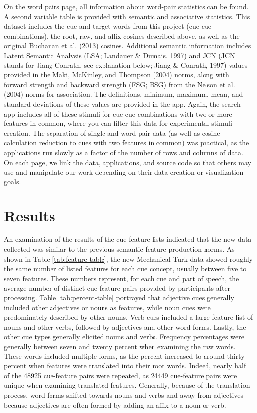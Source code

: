 \documentclass[english,,man]{apa6}
\theoremstyle{definition}
\theoremstyle{definition}
\theoremstyle{definition}
\theoremstyle{remark}
\begin{document}
On the word pairs page, all information about word-pair statistics can
be found. A second variable table is provided with semantic and
associative statistics. This dataset includes the cue and target words
from this project (cue-cue combinations), the root, raw, and affix
cosines described above, as well as the original Buchanan et al. (2013)
cosines. Additional semantic information includes Latent Semantic
Analysis (LSA; Landauer \& Dumais, 1997) and JCN (JCN stands for
Jiang-Conrath, see explanation below; Jiang \& Conrath, 1997) values
provided in the Maki, McKinley, and Thompson (2004) norms, along with
forward strength and backward strength (FSG; BSG) from the Nelson et al.
(2004) norms for association. The definitions, minimum, maximum, mean,
and standard deviations of these values are provided in the app. Again,
the search app includes all of these stimuli for cue-cue combinations
with two or more features in common, where you can filter this data for
experimental stimuli creation. The separation of single and word-pair
data (as well as cosine calculation reduction to cues with two features
in common) was practical, as the applications run slowly as a factor of
the number of rows and columns of data. On each page, we link the data,
applications, and source code so that others may use and manipulate our
work depending on their data creation or visualization goals.

\hypertarget{results}{%
\section{Results}\label{results}}

An examination of the results of the cue-feature lists indicated that
the new data collected was similar to the previous semantic feature
production norms. As shown in Table \ref{tab:feature-table}, the new
Mechanical Turk data showed roughly the same number of listed features
for each cue concept, usually between five to seven features. These
numbers represent, for each cue and part of speech, the average number
of distinct cue-feature pairs provided by participants after processing.
Table \ref{tab:percent-table} portrayed that adjective cues generally
included other adjectives or nouns as features, while noun cues were
predominately described by other nouns. Verb cues included a large
feature list of nouns and other verbs, followed by adjectives and other
word forms. Lastly, the other cue types generally elicited nouns and
verbs. Frequency percentages were generally between seven and twenty
percent when examining the raw words. These words included multiple
forms, as the percent increased to around thirty percent when features
were translated into their root words. Indeed, nearly half of the 48925
cue-feature pairs were repeated, as 24449 cue-feature pairs were unique
when examining translated features. Generally, because of the
translation process, word forms shifted towards nouns and verbs and away
from adjectives because adjectives are often formed by adding an affix
to a noun or verb.
\end{document}
